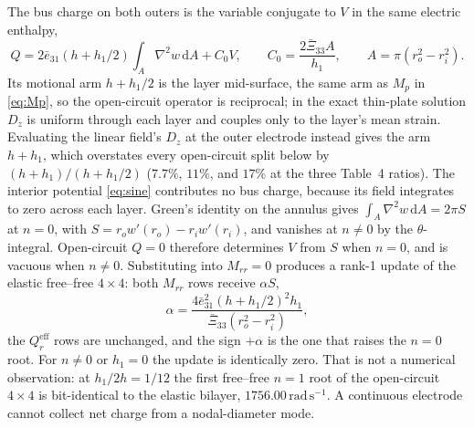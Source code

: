 \documentclass[11pt]{article}
\newcommand{\eebar}{\bar{e}_{31}}
\newcommand{\Xibar}{\bar{\Xi}_{33}}
\begin{document}
The bus charge on both outers is the variable conjugate to $V$ in the
same electric enthalpy,
\begin{equation}
Q=2\eebar(h+h_1/2)\int_A\nabla^2 w\,\mathrm{d}A+C_0 V,\qquad
C_0=\frac{2\Xibar A}{h_1},\qquad
A=\pi(r_o^2-r_i^2).
\label{eq:Q}
\end{equation}
Its motional arm $h+h_1/2$ is the layer mid-surface, the same arm as
$M_p$ in \eqref{eq:Mp}, so the open-circuit operator is reciprocal; in
the exact thin-plate solution $D_z$ is uniform through each layer and
couples only to the layer's mean strain. Evaluating the linear field's
$D_z$ at the outer electrode instead gives the arm $h+h_1$, which
overstates every open-circuit split below by $(h+h_1)/(h+h_1/2)$
($7.7\%$, $11\%$, and $17\%$ at the three Table~4 ratios). The interior
potential \eqref{eq:sine} contributes no bus charge, because its field
integrates to zero across each layer. Green's identity on the annulus
gives $\int_A\nabla^2 w\,\mathrm{d}A=2\pi S$ at $n=0$, with
$S=r_o w'(r_o)-r_i w'(r_i)$, and vanishes at $n\neq0$ by the
$\theta$-integral. Open-circuit $Q=0$ therefore determines $V$ from $S$
when $n=0$, and is vacuous when $n\neq0$. Substituting into $M_{rr}=0$
produces a rank-1 update of the elastic free--free $4\times4$: both
$M_{rr}$ rows receive $\alpha S$,
\begin{equation}
\alpha=\frac{4\eebar^2 (h+h_1/2)^2h_1}{\Xibar(r_o^2-r_i^2)},
\label{eq:alpha}
\end{equation}
the $Q_r^{\mathrm{eff}}$ rows are unchanged, and the sign $+\alpha$ is the one that
raises the $n=0$ root. For $n\neq0$ or $h_1=0$ the update is identically
zero. That is not a numerical observation: at $h_1/2h=1/12$ the first
free--free $n=1$ root of the open-circuit $4\times4$ is bit-identical to
the elastic bilayer, $1756.00\,\mathrm{rad\,s^{-1}}$. A continuous
electrode cannot collect net charge from a nodal-diameter mode.
\end{document}
